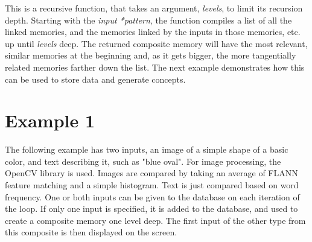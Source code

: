 \documentclass{report}
\begin{document}
This is a recursive function, that takes an argument, \textit{levels}, to limit its recursion depth. Starting with the \textit{input *pattern}, the function compiles a list of all the linked memories, and the memories linked by the inputs in those memories, etc. up until \textit{levels} deep. The returned composite memory will have the most relevant, similar memories at the beginning and, as it gets bigger, the more tangentially related memories farther down the list. The next example demonstrates how this can be used to store data and generate concepts. 

\section{Example 1}

The following example has two inputs, an image of a simple shape of a basic color, and text describing it, such as "blue oval". For image processing, the OpenCV library is used. Images are compared by taking an average of FLANN feature matching and a simple histogram. Text is just compared based on word frequency. One or both inputs can be given to the database on each iteration of the loop. If only one input is specified, it is added to the database, and used to create a composite memory one level deep. The first input of the other type from this composite is then displayed on the screen. 
\lstset{style=ccode}
\end{document}
